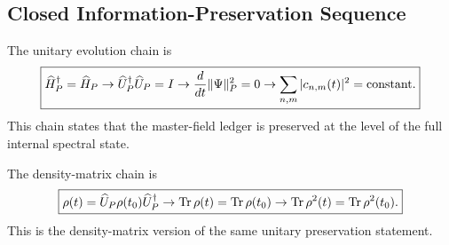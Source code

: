 \documentclass[11pt]{article}
\begin{document}
\subsection{Closed Information-Preservation Sequence}

The unitary evolution chain is
\begin{equation}
\boxed{
\widehat H_P^\dagger=\widehat H_P
\rightarrow
\widehat U_P^\dagger\widehat U_P=I
\rightarrow
\frac{d}{dt}\|\Psi\|_P^2=0
\rightarrow
\sum_{n,m}|c_{n,m}(t)|^2
=
{\rm constant}.
}
\end{equation}
This chain states that the master-field ledger is preserved at the level of the
full internal spectral state.

The density-matrix chain is
\begin{equation}
\boxed{
\rho(t)
=
\widehat U_P\rho(t_0)\widehat U_P^\dagger
\rightarrow
{\rm Tr}\,\rho(t)
=
{\rm Tr}\,\rho(t_0)
\rightarrow
{\rm Tr}\,\rho^2(t)
=
{\rm Tr}\,\rho^2(t_0).
}
\end{equation}
This is the density-matrix version of the same unitary preservation statement.
\end{document}
